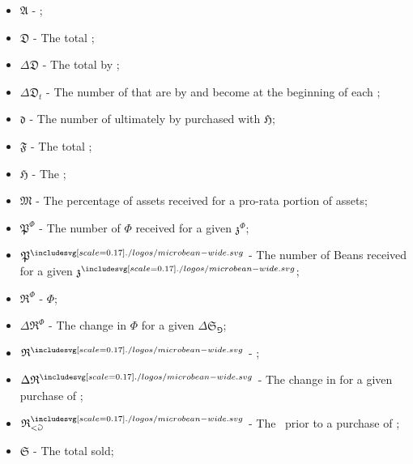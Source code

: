 \documentclass[class=article, crop=false]{standalone}
\begin{document}
\begin{itemize}[topsep=0pt, itemsep=3pt,leftmargin=16pt]
    \item[] $\mathfrak{A}$ - \hypertarget{ht12}{};
    \item[] $\mathfrak{D}$ - \hypertarget{ht41}{The total };
    \item[] $\Delta \mathfrak{D}$ - \hypertarget{ht54}{The total   by };
    \item[] $\Delta \mathfrak{D}_t$ - \hypertarget{ht55}{The number of  that are  by  and become  at the beginning of each };
    \item[] $\mathfrak{d}$ - \hypertarget{ht42}{The number of  ultimately  by  purchased with  $\mathfrak{H}$};
    \item[] $\mathfrak{F}$ - \hypertarget{ht85}{The total };
    \item[] $\mathfrak{H}$ - \hypertarget{ht111}{The };
    \item[] $\mathfrak{M}$ - \hypertarget{ht129}{The percentage of  assets received for  a pro-rata portion of  assets};
    \item[] $\mathfrak{P}^{\Phi}$ - \hypertarget{ht143}{The number of $\Phi$ received for  a given $\mathfrak{z}^{\Phi}$};
    \item[] $\mathfrak{P}^{\bean}$ - \hypertarget{ht142}{The number of Beans received for  a given $\mathfrak{z}^{\bean}$};
    \item[] $\mathfrak{R}^{\Phi}$ - \hypertarget{ht160}{ $\Phi$};
    \item[] $\Delta \mathfrak{R}^{\Phi}$ - \hypertarget{ht59}{The change in  $\Phi$ for a given $\Delta \mathfrak{S}_{\Game}$};
    \item[] $\mathfrak{R}^{\bean}$ - \hypertarget{ht158}{ \Bean};
    \item[] $\Delta \mathfrak{R}^{\bean}$ - \hypertarget{ht58}{The change in  \Bean for a given purchase of };
    \item[] $\mathfrak{R}_{<\Game}^{\bean}$ - \hypertarget{ht159}{The  \Bean\ prior to a purchase of };
    \item[] $\mathfrak{S}$ - \hypertarget{ht174}{The total  sold};

\end{itemize}
\end{document}
